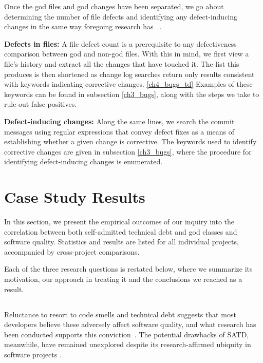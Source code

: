 Once the god files and god changes have been separated, we go about determining the number of file defects and identifying any defect-inducing changes in the same way foregoing research has ~\cite{Kamei-tse-2013, Kim-tse-2008, sliwerski-msr-2005}.

\noindent\textbf{Defects in files:}
A file defect count is a prerequisite to any defectiveness comparison between god and non-god files. With this in mind, we first view a file's history and extract all the changes that have touched it. The list this produces is then shortened as change log searches return only results consistent with keywords indicating corrective changes. \ref{ch4_bugs_td}
Examples of these keywords can be found in subsection \ref{ch3_bugs}, along with the steps we take to rule out false positives.


\noindent \textbf{Defect-inducing changes:}
Along the same lines, we search the commit messages using regular expressions that convey defect fixes as a means of establishing whether a given change is corrective. The keywords used to identify corrective changes are given in subsection \ref{ch3_bugs}, where the procedure for identifying defect-inducing changes is enumerated.

\section{Case Study Results}
\label{chap4:sec:case_study_results}

In this section, we present the empirical outcomes of our inquiry into the correlation between both self-admitted technical debt and god classes and software quality. Statistics and results are listed for all individual projects, accompanied by cross-project comparisons.

Each of the three research questions is restated below, where we summarize its motivation, our approach in treating it and the conclusions we reached as a result.

\subsection*{\chapterIVrqI}


Reluctance to resort to code smells and technical debt suggests that most developers believe these adversely affect software quality, and what research has been conducted supports this conviction~\cite{zazworka2011investigating}. %
 The potential drawbacks of SATD, meanwhile, have remained unexplored despite its research-affirmed ubiquity in software projects \cite{ICSM_PotdarS14}.

